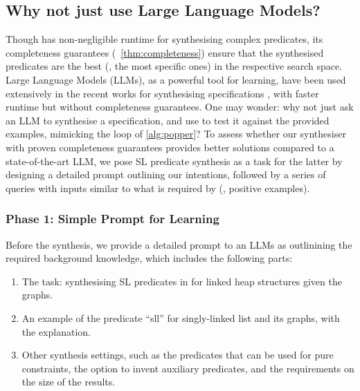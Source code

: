 \subsection{Why not just use Large Language Models?}

Though \tool has non-negligible runtime for synthesising complex
predicates, its completeness guarantees
(\cf~\autoref{thm:completeness}) ensure that the synthesised
predicates are the best (\ie, the most specific ones) in the
respective search space.
%
Large Language Models (LLMs), as a powerful tool for learning, have
been used extensively in the recent works for synthesising
specifications \cite{wen2024enchanting,ma2024specgen}, with faster
runtime but without completeness guarantees.
%
One may wonder: why not just ask an LLM to synthesise a specification,
and use \prolog to test it against the provided examples, mimicking the
loop of \autoref{alg:popper}?
%
To assess whether our synthesiser with proven completeness guarantees
provides better solutions compared to a state-of-the-art LLM, we pose
SL predicate synthesis as a task for the latter by designing a
detailed prompt outlining our intentions, followed by a series of
queries with inputs similar to what is required by \tool (\ie,
positive examples).
%


\subsubsection*{Phase 1: Simple Prompt for Learning}

Before the synthesis, we provide a detailed prompt to an LLMs as
outlinining the required background knowledge, which includes the
following parts:

\begin{enumerate}
\item The task: synthesising SL predicates in \prolog for linked heap
  structures given the graphs.
%
\item An example of the predicate ``sll'' for singly-linked list and
  its graphs, with the explanation. 
%
\item Other synthesis settings,
  such as the predicates
  that can be used for pure constraints, the option to invent
  auxiliary predicates, and the requirements on the size of the
  results. 
\end{enumerate}

